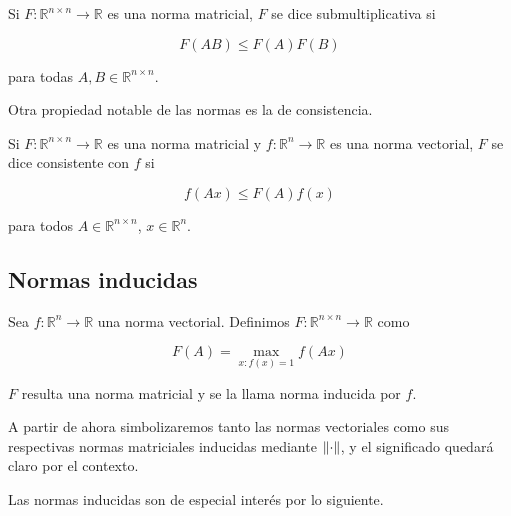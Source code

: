 \begin{defi}
Si $F : \mathbb{R}^{n \times n} \to \mathbb{R}$ es una norma matricial, $F$ se dice submultiplicativa si

\[F(AB) \leq F(A)F(B)\]

para todas $A, B \in \mathbb{R}^{n \times n}$.
\end{defi}

Otra propiedad notable de las normas es la de consistencia.

\begin{defi}
Si $F : \mathbb{R}^{n \times n} \to \mathbb{R}$ es una norma matricial y $f : \mathbb{R}^n \to \mathbb{R}$ es una norma vectorial, $F$ se dice consistente con $f$ si 

\[f(Ax) \leq F(A)f(x)\]

para todos $A \in \mathbb{R}^{n \times n}$, $x \in \mathbb{R}^n$.
\end{defi}

\subsection{Normas inducidas}

\begin{defi}
Sea $f : \mathbb{R}^n \to \mathbb{R}$ una norma vectorial. Definimos $F : \mathbb{R}^{n \times n} \to \mathbb{R}$ como

\[
F(A) = \max\limits_{x : f(x) = 1} f(Ax)
\]

$F$ resulta una norma matricial y se la llama norma inducida por $f$.
\end{defi}

A partir de ahora simbolizaremos tanto las normas vectoriales como sus respectivas normas matriciales inducidas mediante $\left\lVert\cdot\right\rVert$, y el significado quedará claro por el contexto.

Las normas inducidas son de especial interés por lo siguiente.

